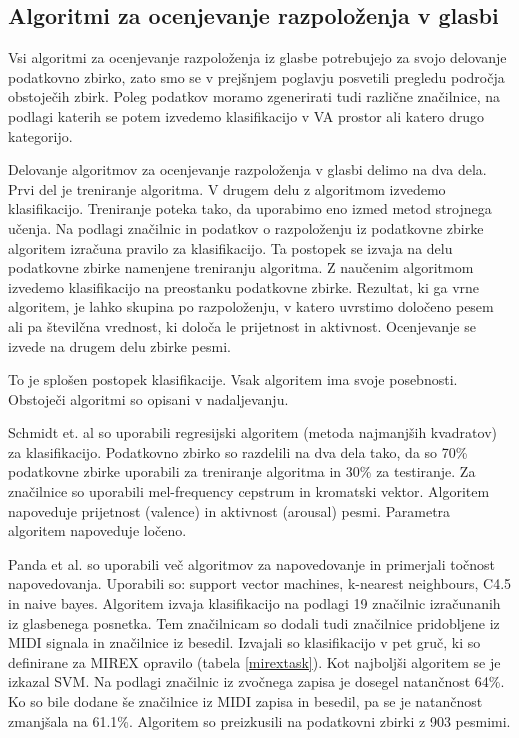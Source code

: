 \documentclass[a4paper, 12pt]{book}
\begin{document}
{\subsection{Algoritmi za ocenjevanje razpoloženja v glasbi} 
\label{algoritmisp}

Vsi algoritmi za ocenjevanje razpoloženja iz glasbe potrebujejo za svojo delovanje podatkovno zbirko, zato smo se v prejšnjem poglavju posvetili pregledu področja obstoječih zbirk. Poleg podatkov moramo zgenerirati tudi različne značilnice, na podlagi katerih se potem izvedemo klasifikacijo v VA prostor ali katero drugo kategorijo.

Delovanje algoritmov za ocenjevanje razpoloženja v glasbi delimo na dva dela. Prvi del je treniranje algoritma. V drugem delu z algoritmom  izvedemo klasifikacijo. Treniranje poteka tako, da uporabimo eno izmed metod strojnega učenja. Na podlagi značilnic in podatkov o razpoloženju iz podatkovne zbirke algoritem izračuna pravilo za klasifikacijo. Ta postopek se izvaja na delu podatkovne zbirke namenjene treniranju algoritma. Z naučenim algoritmom izvedemo klasifikacijo na preostanku podatkovne zbirke. Rezultat, ki ga vrne algoritem, je lahko skupina po razpoloženju, v katero uvrstimo določeno pesem ali pa številčna vrednost, ki določa le prijetnost in aktivnost. Ocenjevanje se izvede na drugem delu zbirke pesmi. 

To je splošen postopek klasifikacije. Vsak algoritem ima svoje posebnosti. Obstoječi algoritmi so opisani v nadaljevanju. 

Schmidt et. al \cite{schmidt2009projection} so uporabili regresijski algoritem (metoda najmanjših kvadratov) za klasifikacijo. Podatkovno zbirko so razdelili na dva dela tako, da so 70\% podatkovne zbirke uporabili za treniranje algoritma in 30\% za testiranje. Za značilnice so uporabili mel-frequency cepstrum in kromatski vektor. Algoritem napoveduje prijetnost (valence) in aktivnost (arousal) pesmi. Parametra algoritem napoveduje ločeno. 

Panda et al. \cite{panda2013multi} so uporabili več algoritmov za napovedovanje in primerjali točnost napovedovanja. Uporabili so: support vector machines, k-nearest neighbours, C4.5 in naive bayes. Algoritem izvaja klasifikacijo na podlagi 19 značilnic izračunanih iz glasbenega posnetka. Tem značilnicam so dodali tudi značilnice pridobljene iz MIDI signala in značilnice iz besedil. Izvajali so klasifikacijo v pet gruč, ki so definirane za MIREX opravilo (tabela \ref{mirextask}).  Kot najboljši algoritem se je izkazal SVM. Na podlagi značilnic iz zvočnega zapisa je dosegel natančnost 64\%. Ko so bile dodane še značilnice iz MIDI zapisa in besedil, pa se je natančnost zmanjšala na 61.1\%. Algoritem so preizkusili na podatkovni zbirki z 903 pesmimi. 

}
\end{document}
